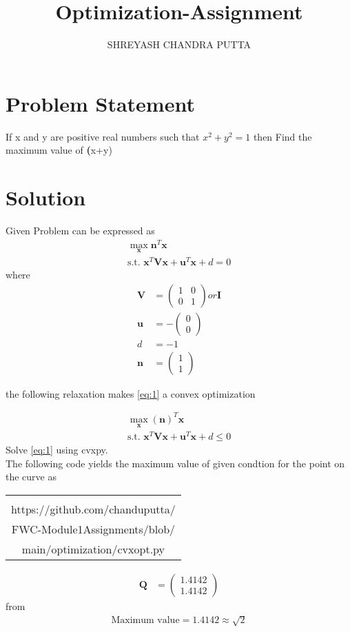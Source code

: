 \documentclass[journal,10pt,twocolumn]{article}
\title{
Optimization-Assignment
}
\author{SHREYASH CHANDRA PUTTA}
\newcommand{\myvec}[1]{\ensuremath{\begin{pmatrix}#1\end{pmatrix}}}
\let\vec\mathbf
\let\vec\mathbf
\providecommand{\brak}[1]{\ensuremath{\left(#1\right)}}
\begin{document}
\maketitle
\tableofcontents
\bigskip
\section{Problem Statement}
If x and y are positive real numbers such that $x^2 +y^2 = 1$ then Find the maximum value of \textbf(x+y)

\section{Solution}

Given Problem can be expressed as 
\begin{align}
\label{eq:1}
\max_{\vec{x}}{\vec{n}}^T{\vec{x}}\\
\label{eq:2}
\text {s.t. }\vec{x}^T\vec{V}\vec{x} + \vec{u}^T\vec{x}  +d = 0
\end{align}
%
where
%
\begin{align}
\vec{V} &= \myvec{1 & 0\\0 & 1} or \vec{I}
\\
\vec{u} &= -\myvec{0 \\ 0}
\\
d &= -1
\\
\vec{n} &= \myvec{1 \\ 1}
\end{align}

the following relaxation makes
\eqref{eq:1} a convex optimization 

\begin{align}
\label{eq:7}
\max_{\vec{x}}\brak{\vec{n}}^T{\vec{x}}\\
\text{s.t. }\vec{x}^T\vec{V}\vec{x} + \vec{u}^T\vec{x} + d \le 0
\end{align}
Solve \eqref{eq:1} using cvxpy.
\\
The following code yields the maximum value of given condtion for the point on the curve as
%
{\setlength\extrarowheight{0pt}
\begin{table}[h]
    \centering
    \begin{tabular}{|c|}
    \hline \\
         https://github.com/chanduputta/\\FWC-Module1Assignments/blob/\\main/optimization/cvxopt.py  \\       
\hline
    \end{tabular}
\end{table}}
%
\begin{align}
\vec{Q} &= \myvec{1.4142\\1.4142}
\end{align}
from 
\begin{align}
\boxed{\text{Maximum value} = 1.4142 \approx \sqrt{2}} \\
\end{align}
\end{document}
